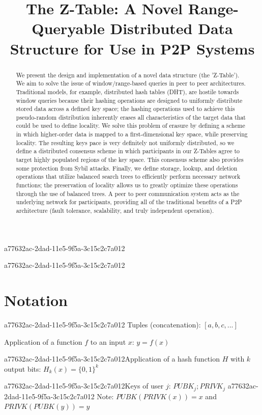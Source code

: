 \documentclass[12pt]{article}
\title{The Z-Table: A Novel Range-Queryable Distributed Data Structure for Use in P2P Systems}
\begin{document}
a77632ac-2dad-11e5-9f5a-3c15c2c7a012
\maketitle
a77632ac-2dad-11e5-9f5a-3c15c2c7a012
\begin{abstract}
We present the design and implementation of a novel data structure (the 'Z-Table'). We aim to solve the issue of window/range-based queries in peer to peer architectures. Traditional models, for example,  distributed hash tables (DHT), are hostile towards window queries because their hashing operations are designed to uniformly distribute stored data across a defined key space; the hashing operations used to achieve this pseudo-random distribution inherently erases all characteristics of the target data that could be used to define locality. We solve this problem of erasure by defining a scheme in which higher-order data is mapped to a first-dimensional key space, while preserving locality. The resulting keys pace is very definitely not uniformly distributed, so we define a distributed consensus scheme in which participants in our Z-Tables agree to target highly populated regions of the key space. This consensus scheme also provides some protection from Sybil attacks. Finally, we define storage, lookup, and deletion operations that utilize balanced search trees to efficiently perform necessary network functions; the preservation of locality allows us to greatly optimize these operations through the use of balanced trees. A peer to peer communication system acts as the underlying network for participants, providing all of the traditional benefits of a P2P architecture (fault tolerance, scalability, and truly independent operation).
\end{abstract}

\section{Notation}
a77632ac-2dad-11e5-9f5a-3c15c2c7a012
Tuples (concatenation): $[a,b,c,...]$

Application of a function $f$ to an input $x$: $y=f(x)$

a77632ac-2dad-11e5-9f5a-3c15c2c7a012Application of a hash function $H$ with $k$ output bits: $H_{k}(x) = \{0,1\}^k$

a77632ac-2dad-11e5-9f5a-3c15c2c7a012Keys of user $j$: $ PUBK_j; PRIVK_j $
a77632ac-2dad-11e5-9f5a-3c15c2c7a012
Note: $PUBK(PRIVK(x)) = x$ and $PRIVK(PUBK(y)) = y$~
\end{document}
